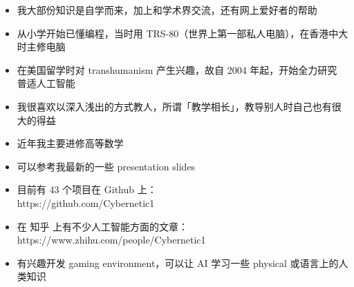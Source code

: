 \documentclass[10pt,a4paper]{altacv}
\begin{document}

\begin{fullwidth}
\makecvheader
\end{fullwidth}





\begin{itemize}
\item 我大部份知识是自学而来，加上和学术界交流，还有网上爱好者的帮助
\item 从小学开始已懂编程，当时用 TRS-80（世界上第一部私人电脑），在香港中大时主修电脑
\item 在美国留学时对 transhumanism 产生兴趣，故自 2004 年起，开始全力研究 普适人工智能
\item 我很喜欢以深入浅出的方式教人，所谓「教学相长」，教导别人时自己也有很大的得益
\item 近年我主要进修高等数学
\item 可以参考我最新的一些 presentation slides
\item 目前有 43 个项目在 Github 上： \\
	{\footnotesize https://github.com/Cybernetic1}
\item 在 知乎 上有不少人工智能方面的文章： \\
	{\footnotesize https://www.zhihu.com/people/Cybernetic1}
\item 有兴趣开发 gaming environment，可以让 AI 学习一些 physical 或语言上的人类知识
\end{itemize}
\end{document}
